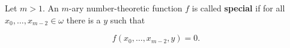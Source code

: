 Let $m > 1$. An $m$-ary number-theoretic function $f$ is called \textbf{special} if for all $x_0, \ldots, x_{m-2} \in \omega$ there is a $y$ such that

$$f(x_0, \ldots, x_{m-2}, y) = 0.$$
